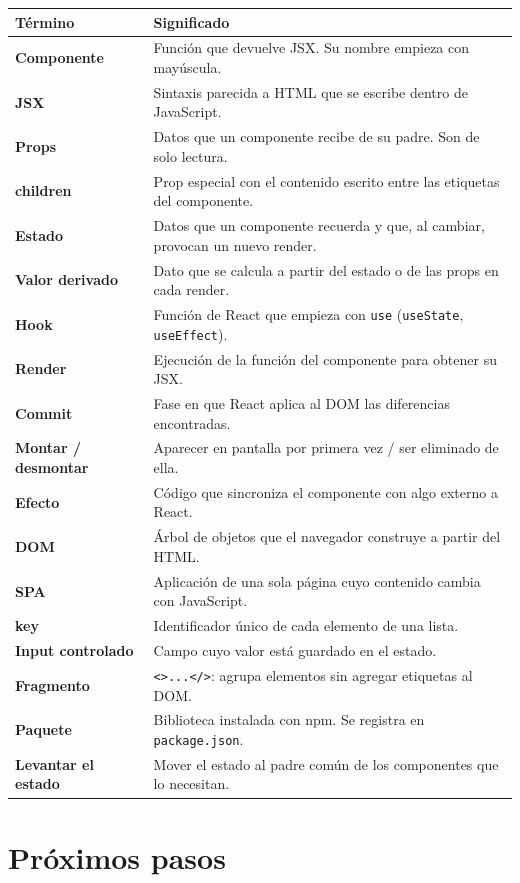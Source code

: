 \documentclass[11pt,a4paper]{article}
\newcommand{\cmd}[1]{\texttt{\color{reactdark}#1}}
\begin{document}
\begin{center}
\small
\begin{tabular}{>{\bfseries}p{3.4cm} p{10.2cm}}
\toprule
Término & Significado \\
\midrule
Componente & Función que devuelve JSX. Su nombre empieza con mayúscula. \\
JSX & Sintaxis parecida a HTML que se escribe dentro de JavaScript. \\
Props & Datos que un componente recibe de su padre. Son de solo lectura. \\
children & Prop especial con el contenido escrito entre las etiquetas del componente. \\
Estado & Datos que un componente recuerda y que, al cambiar, provocan un nuevo render. \\
Valor derivado & Dato que se calcula a partir del estado o de las props en cada render. \\
Hook & Función de React que empieza con \cmd{use} (\cmd{useState}, \cmd{useEffect}). \\
Render & Ejecución de la función del componente para obtener su JSX. \\
Commit & Fase en que React aplica al DOM las diferencias encontradas. \\
Montar / desmontar & Aparecer en pantalla por primera vez / ser eliminado de ella. \\
Efecto & Código que sincroniza el componente con algo externo a React. \\
DOM & Árbol de objetos que el navegador construye a partir del HTML. \\
SPA & Aplicación de una sola página cuyo contenido cambia con JavaScript. \\
key & Identificador único de cada elemento de una lista. \\
Input controlado & Campo cuyo valor está guardado en el estado. \\
Fragmento & \cmd{<>...</>}: agrupa elementos sin agregar etiquetas al DOM. \\
Paquete & Biblioteca instalada con npm. Se registra en \cmd{package.json}. \\
Levantar el estado & Mover el estado al padre común de los componentes que lo necesitan. \\
\bottomrule
\end{tabular}
\end{center}


\section{Próximos pasos}
\end{document}
